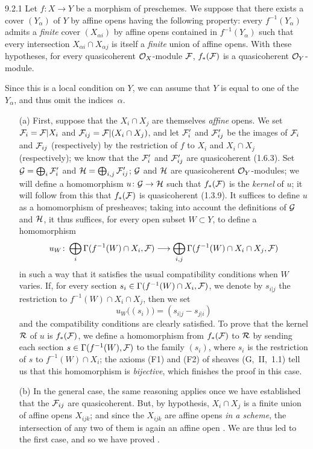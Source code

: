 
\begin{env}[Proposition]{9.2.1} Let $f\colon X\to Y$ be a morphism of
preschemes.  We suppose that there exists a cover $(Y_\alpha)$ of $Y$ by affine
opens having the following property: every $f^{-1}(Y_\alpha)$ admits a
\emph{finite} cover $(X_{\alpha i})$ by affine opens contained in
$f^{-1}(Y_\alpha)$ such that every intersection $X_{\alpha i}\cap X_{\alpha j}$
is itself a \emph{finite} union of affine opens.  With these hypotheses, for
every quasicoherent $\mathcal{O}_X$-module $\mathcal{F}$, $f_\ast(\mathcal{F})$ is a
quasicoherent $\mathcal{O}_Y$-module.
\end{env}

Since this is a local condition on $Y$, we can assume that $Y$ is equal to one
of the $Y_\alpha$, and thus omit the indices~$\alpha$.

\begin{itemize}
\item[(a)] First, suppose that the $X_i\cap X_j$
are themselves \emph{affine} opens.  We set $\mathcal{F}_i=\mathcal{F}|X_i$ and
$\mathcal{F}_{ij}=\mathcal{F}|(X_i\cap X_j)$, and let $\mathcal{F}'_i$ and
$\mathcal{F}'_{ij}$ be the images of $\mathcal{F}_i$ and $\mathcal{F}_{ij}$
(respectively) by the restriction of $f$ to $X_i$ and $X_i\cap X_j$
(respectively); we know that the $\mathcal{F}'_i$ and $\mathcal{F}'_{ij}$ are
quasicoherent (1.6.3).  Set $\mathcal{G}=\bigoplus_i\mathcal{F}'_i$ and
$\mathcal{H}=\bigoplus_{i,j}\mathcal{F}'_{ij}$; $\mathcal{G}$ and $\mathcal{H}$ are
quasicoherent $\mathcal{O}_Y$-modules; we will define a homomorphism
$u\colon\mathcal{G}\to\mathcal{H}$ such that $f_\ast(\mathcal{F})$ is the
\emph{kernel} of $u$; it will follow from this that $f_\ast(\mathcal{F})$ is
quasicoherent (1.3.9).  It suffices to define $u$ as a homomorphism
of presheaves; taking into account the definitions of $\mathcal{G}$ and
$\mathcal{H}$, it thus suffices, for every open subset $W\subset Y$, to define a
homomorphism
\[
   {u_W\colon\bigoplus_i\Gamma(f^{-1}(W)\cap X_i,\mathcal{F})}\longrightarrow
   {\bigoplus_{i,j}\Gamma(f^{-1}(W)\cap X_i\cap X_j,\mathcal{F})}
\]
in such a way that it satisfies the usual
compatibility conditions when $W$ varies.  If, for every section
$s_i\in\Gamma(f^{-1}(W)\cap X_i, \mathcal{F})$, we denote by $s_{i|j}$ the
restriction to $f^{-1}(W)\cap X_i\cap X_j$, then we set \[
u_W\big((s_i)\big)=(s_{i|j}-s_{j|i}) \] and the compatibility conditions are
clearly satisfied.  To prove that the kernel $\mathcal{R}$ of $u$ is
$f_\ast(\mathcal{F})$, we define a homomorphism from $f_\ast(\mathcal{F})$ to
$\mathcal{R}$ by sending each section $s\in\Gamma(f^{-1}(W),\mathcal{F})$ to the
family $(s_i)$, where $s_i$ is the restriction of $s$ to $f^{-1}(W)\cap X_i$;
the axioms (F1) and (F2) of sheaves (G,~II,~1.1) tell us that this homomorphism
is \emph{bijective}, which finishes the proof in this case.
\item[(b)] In the general case, the same reasoning applies once we have established
that the $\mathcal{F}_{ij}$ are quasicoherent.  But, by hypothesis, $X_i\cap X_j$ is a
finite union of affine opens $X_{ijk}$; and since the $X_{ijk}$ are affine opens
\emph{in a scheme}, the intersection of any two of them is again an affine open
.  We are thus led to the first case, and so we have proved .
\end{itemize}

